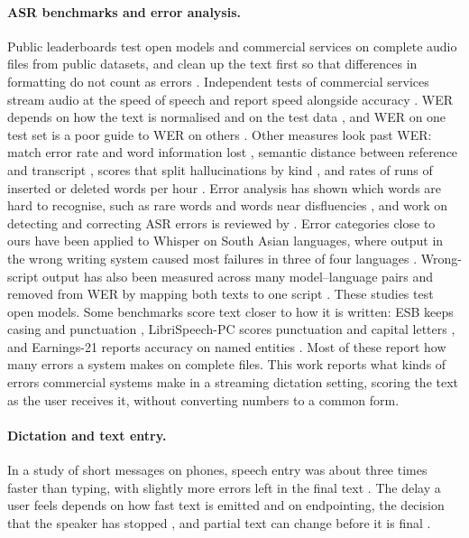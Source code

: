 \documentclass[11pt]{article}
\begin{document}
\paragraph{ASR benchmarks and error analysis.} Public leaderboards test open models and commercial services on complete audio files from public datasets, and clean up the text first so that differences in formatting do not count as errors \citep{srivastav2026openasr,radford2023whisper}. Independent tests of commercial services stream audio at the speed of speech and report speed alongside accuracy \citep{aa}. WER depends on how the text is normalised and on the test data \citep{szymanski2020wer}, and WER on one test set is a poor guide to WER on others \citep{likhomanenko2021rethinking}. Other measures look past WER: match error rate and word information lost \citep{morris2004wer}, semantic distance between reference and transcript \citep{kim2021semdist}, scores that split hallucinations by kind \citep{koudounas2026shallow}, and rates of runs of inserted or deleted words per hour \citep{ramirez2024anatomy}. Error analysis has shown which words are hard to recognise, such as rare words and words near disfluencies \citep{goldwater2010words}, and work on detecting and correcting ASR errors is reviewed by \citet{errattahi2018errors}. Error categories close to ours have been applied to Whisper on South Asian languages, where output in the wrong writing system caused most failures in three of four languages \citep{azeemi2026southasian}. Wrong-script output has also been measured across many model--language pairs \citep{rahman2026scriptcollapse} and removed from WER by mapping both texts to one script \citep{pattnayak2026snwer}. These studies test open models. Some benchmarks score text closer to how it is written: ESB keeps casing and punctuation \citep{gandhi2022esb}, LibriSpeech-PC scores punctuation and capital letters \citep{meister2023librispeechpc}, and Earnings-21 reports accuracy on named entities \citep{delrio2021earnings21}. Most of these report how many errors a system makes on complete files. This work reports what kinds of errors commercial systems make in a streaming dictation setting, scoring the text as the user receives it, without converting numbers to a common form.

\paragraph{Dictation and text entry.} In a study of short messages on phones, speech entry was about three times faster than typing, with slightly more errors left in the final text \citep{ruan2017speech}. The delay a user feels depends on how fast text is emitted and on endpointing, the decision that the speaker has stopped \citep{shangguan2021latency}, and partial text can change before it is final \citep{shangguan2020stability}.
\end{document}
